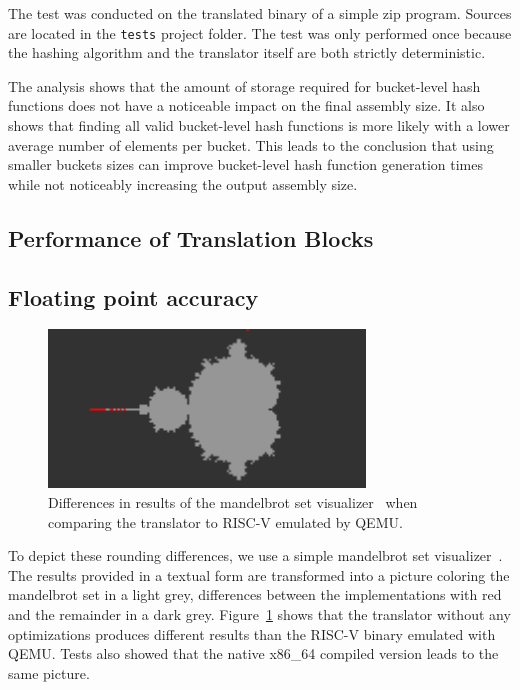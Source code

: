 \documentclass[course=eragp]{aspdoc}
\begin{document}
\par

The test was conducted on the translated binary of a simple zip program. Sources are located in the
\texttt{tests} project folder. The test was only performed once because the hashing algorithm and
the translator itself are both strictly deterministic.

\par

The analysis shows that
the amount of storage required for bucket-level hash functions does not have a noticeable impact on
the final assembly size. It also shows that finding all valid bucket-level hash functions is more
likely with a lower average number of elements per bucket. This leads to the conclusion that using
smaller buckets sizes can improve bucket-level hash function generation times while not noticeably
increasing the output assembly size.

\subsection{Performance of Translation Blocks}\label{sec:translation_blocks}

\subsection{Floating point accuracy}

\begin{figure}[H]
    \centering
    \includegraphics[width=0.75\textwidth]{images/mandelbrot_differences/translated_diff.png}
    \caption{Differences in results of the mandelbrot set visualizer~\cite{mandelbrot_program} when
        comparing the translator to RISC-V emulated by QEMU.}\label{fig:mandelbrot_diff_translator}
\end{figure}

To depict these rounding differences, we use a simple mandelbrot set
visualizer~\cite{mandelbrot_program}. The results provided in a textual form are transformed into a
picture coloring the mandelbrot set in a light grey, differences between the implementations with
red and the remainder in a dark grey. Figure~\ref{fig:mandelbrot_diff_translator} shows that the
translator without any optimizations produces different results than the RISC-V binary emulated with
QEMU. Tests also showed that the native x86\_64 compiled version leads to the same picture.
\end{document}

